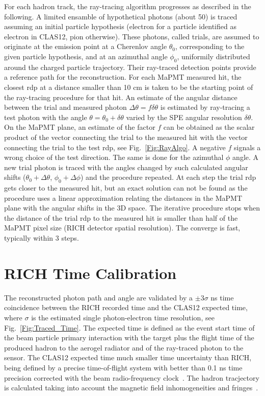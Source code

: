 \documentclass[final,5p,times,twocolumn]{elsarticle}
\def\MAPMT{MaPMT }
\begin{document}
For each hadron track, the ray-tracing algorithm progresses as described in the following. A limited ensamble of 
hypothetical photons (about 50) is traced assuming an initial particle hypothesis (electron for a particle identified 
as electron in CLAS12, pion otherwise). These photons, called trials, are assumed to originate at the
emission point at a Cherenlov angle $\theta_0$, corresponding to the given particle hypothesis, and at an azimuthal angle
$\phi_0$, uniformily distributed around the charged particle trajectory.
Their ray-traced detection points provide a reference path for the reconstruction. 
For each \MAPMT measured hit, the closest rdp at a distance smaller than 10 cm is taken to be the starting point of the ray-tracing procedure for that hit.
An estimate of the angular distance between the trial and measured photon $\Delta \theta = f \delta \theta$ is
estimated by ray-tracing a test photon with the angle $\theta=\theta_0 + \delta \theta$ varied 
by the SPE angular resolution $\delta \theta$. On the \MAPMT plane, an estimate of the factor $f$ can be obtained
as the scalar product of the vector connecting the trial to the measured hit with the 
vector connecting the trial to the test rdp, see Fig.~\ref{Fig:RayAlgo}. A negative $f$ signals a wrong choice of the test direction. 
The same is done for the azimuthal $\phi$ angle. 
A new trial photon is traced with the angles changed by such calculated angular shifts 
($\theta_0 + \Delta \theta$, $\phi_0 + \Delta \phi$) and the procedure
repeated. At each step the trial rdp gets closer to the measured hit, but an exact solution can 
not be found as the procedure uses a linear approximation relating the distances in the \MAPMT plane with 
the angular shifts in the 3D space. The iterative procedure stops when 
the distance of the trial rdp to the measured hit is smaller than half of the \MAPMT pixel size (RICH detector spatial resolution).
The converge is fast, typically within 3 steps.

\section{RICH Time Calibration}

The reconstructed photon path and angle are validated by a $\pm 3\sigma$ ns time coincidence between the RICH 
recorded time and the CLAS12 expected time, where $\sigma$ is the estimated single photon-electron time resolution, 
see Fig.~\ref{Fig:Traced_Time}. The expected time is defined as the event start time of the 
beam particle primary interaction with the target plus the flight time of the produced hadron to the aerogel 
radiator and of the ray-traced photon to the sensor.
The CLAS12 expected time much smaller time uncertainty than RICH, 
being defined by a precise time-of-flight system with better than 0.1 ns time precision corrected
with the beam radio-frequency clock~\cite{Ref:CLASTOF}. The hadron tracjectory is calculated taking into account the magnetic field 
inhomogeneities and fringes~\cite{Ref:CLASDC}.
\end{document}
